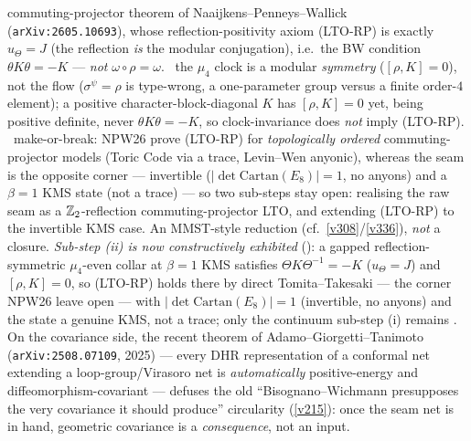 commuting-projector theorem of Naaijkens--Penneys--Wallick (\texttt{arXiv:2605.10693}), whose reflection-positivity
axiom (LTO-RP) is exactly $u_\Theta{=}J$ (the reflection \emph{is} the modular conjugation), i.e.\ the BW condition
$\theta K\theta{=}-K$ --- \emph{not} $\omega{\circ}\rho{=}\omega$. \mE\ the $\mu_4$ clock is a modular \emph{symmetry}
($[\rho,K]{=}0$), not the flow ($\sigma^\psi{=}\rho$ is type-wrong, a one-parameter group versus a finite order-$4$
element); a positive character-block-diagonal $K$ has $[\rho,K]{=}0$ yet, being positive definite, never
$\theta K\theta{=}-K$, so clock-invariance does \emph{not} imply (LTO-RP). \mO\ make-or-break: NPW26 prove (LTO-RP)
for \emph{topologically ordered} commuting-projector models (Toric Code via a trace, Levin--Wen anyonic), whereas the
seam is the opposite corner --- invertible ($|\det\mathrm{Cartan}(E_8)|{=}1$, no anyons) and a $\beta{=}1$ KMS state
(not a trace) --- so two sub-steps stay open: realising the raw seam as a $\mathbb Z_2$-reflection commuting-projector LTO,
and extending (LTO-RP) to the invertible KMS case. An MMST-style reduction (cf.\ \vref{v308}/\vref{v336}), \emph{not}
a closure. \emph{Sub-step (ii) is now constructively exhibited} (): a gapped
reflection-symmetric $\mu_4$-even collar at $\beta{=}1$ KMS satisfies $\Theta K\Theta^{-1}{=}{-}K$
($u_\Theta{=}J$) and $[\rho,K]{=}0$, so (LTO-RP) holds there by direct Tomita--Takesaki --- the corner NPW26
leave open --- with $|\!\det\mathrm{Cartan}(E_8)|{=}1$ (invertible, no anyons) and the state a genuine KMS,
not a trace; only the continuum sub-step (i) remains \mO. On the covariance side, the recent theorem of
Adamo--Giorgetti--Tanimoto (\texttt{arXiv:2508.07109}, 2025) --- every DHR representation of a conformal net
extending a loop-group/Virasoro net is \emph{automatically} positive-energy and diffeomorphism-covariant ---
defuses the old ``Bisognano--Wichmann presupposes the very covariance it should produce'' circularity (\vref{v215}):
once the seam net is in hand, geometric covariance is a \emph{consequence}, not an input.
